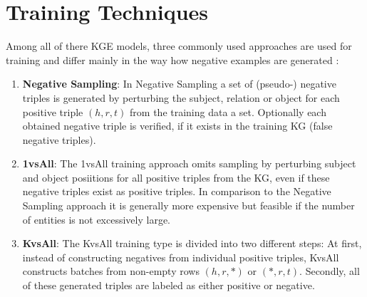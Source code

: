 \section{Training Techniques}
\label{sec:training_techniques}

Among all of there \ac{KGE} models, three commonly used approaches are used for training and differ mainly in the way how negative examples are generated \cite{Ruffinelli2020You}:

\begin{enumerate}
    \item \textbf{Negative Sampling}:  
    In Negative Sampling a set of (pseudo-) negative triples is generated by perturbing the subject, relation or object for each positive triple $(h, r, t)$ from the training data a set.
    Optionally each obtained negative triple is verified, if it exists in the training \ac{KG} (false negative triples).

    \item \textbf{1vsAll}:
    The 1vsAll training approach omits sampling by perturbing subject and object posiitions for all positive triples from the \ac{KG}, even if these negative triples exist as positive triples.
    In comparison to the Negative Sampling approach it is generally more expensive but feasible if the number of entities is not excessively large.
    
    \item \textbf{KvsAll}:
    The KvsAll training type is divided into two different steps:
    At first, instead of constructing negatives from individual positive triples, KvsAll constructs batches from non-empty rows $(h,r,*)$ or $(*,r,t)$.
    Secondly, all of these generated triples are labeled as either positive or negative.
\end{enumerate}